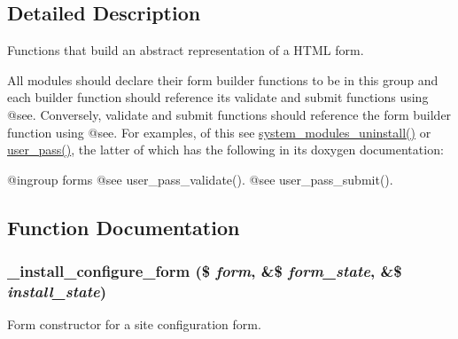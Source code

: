 \subsection{Detailed Description}
Functions that build an abstract representation of a HTML form.

All modules should declare their form builder functions to be in this group and each builder function should reference its validate and submit functions using @see. Conversely, validate and submit functions should reference the form builder function using @see. For examples, of this see \hyperlink{group__forms_gadb3d128adf18e3ff4e23ada8271b24c8}{system\_\-modules\_\-uninstall()} or \hyperlink{group__forms_gad7f952e136ebcff493ca8de7209100cf}{user\_\-pass()}, the latter of which has the following in its doxygen documentation:

@ingroup forms @see user\_\-pass\_\-validate(). @see user\_\-pass\_\-submit(). 

\subsection{Function Documentation}
\hypertarget{group__forms_ga21b381d33cf055bce4286d99dafad24b}{
\subsubsection[{\_\-install\_\-configure\_\-form}]{\setlength{\rightskip}{0pt plus 5cm}\_\-install\_\-configure\_\-form (\$ {\em form}, \/  \&\$ {\em form\_\-state}, \/  \&\$ {\em install\_\-state})}}
\label{group__forms_ga21b381d33cf055bce4286d99dafad24b}
Form constructor for a site configuration form.



